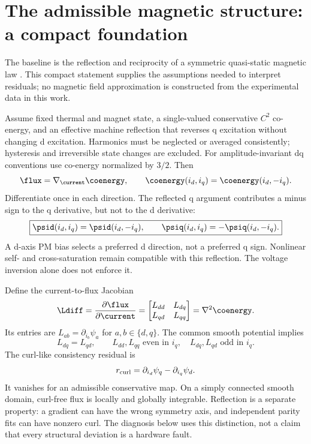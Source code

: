 \section{The admissible magnetic structure: a compact foundation}
\label{sec:symmetry}
The baseline is the reflection and reciprocity of a symmetric quasi-static
magnetic law \cite{sun2020,jebai2014}. This compact statement supplies the
assumptions needed to interpret residuals; no magnetic field approximation
is constructed from the experimental data in this work.

Assume fixed thermal and magnet state, a single-valued conservative $C^2$
co-energy, and an effective machine reflection that reverses q excitation
without changing d excitation. Harmonics must be neglected or averaged
consistently; hysteresis and irreversible state changes are excluded.
For amplitude-invariant dq conventions use co-energy normalized by $3/2$.
Then
\begin{equation}
 \flux=\nabla_{\current}\coenergy,\qquad
 \coenergy(i_d,i_q)=\coenergy(i_d,-i_q).\label{eq:energy-parity}
\end{equation}
Differentiate once in each direction. The reflected q argument contributes
a minus sign to the q derivative, but not to the d derivative:
\begin{equation}
 \boxed{\psid(i_d,i_q)=\psid(i_d,-i_q),\qquad
 \psiq(i_d,i_q)=-\psiq(i_d,-i_q).}\label{eq:flux-parity}
\end{equation}
A d-axis PM bias selects a preferred d direction, not a preferred q sign.
Nonlinear self- and cross-saturation remain compatible with this reflection.
The voltage inversion alone does not enforce it.

Define the current-to-flux Jacobian
\begin{equation}
 \Ldiff=\frac{\partial\flux}{\partial\current}
 =\begin{bmatrix}L_{dd}&L_{dq}\\L_{qd}&L_{qq}\end{bmatrix}
 =\nabla^2\coenergy.\label{eq:jacobian}
\end{equation}
Its entries are $L_{ab}=\partial_{i_b}\psi_a$ for $a,b\in\{d,q\}$.
The common smooth potential implies
\begin{equation}
 L_{dq}=L_{qd},\qquad
 L_{dd},L_{qq}\text{ even in }i_q,\quad
 L_{dq},L_{qd}\text{ odd in }i_q.\label{eq:inductance-parities}
\end{equation}
The curl-like consistency residual is
\begin{equation}
 r_{\rm curl}=\partial_{i_d}\psi_q-\partial_{i_q}\psi_d.
 \label{eq:curl-definition}
\end{equation}
It vanishes for an admissible conservative map. On a simply connected smooth
domain, curl-free flux is locally and globally integrable. Reflection is a
separate property: a gradient can have the wrong symmetry axis, and independent
parity fits can have nonzero curl. The diagnosis below uses this distinction,
not a claim that every structural deviation is a hardware fault.
